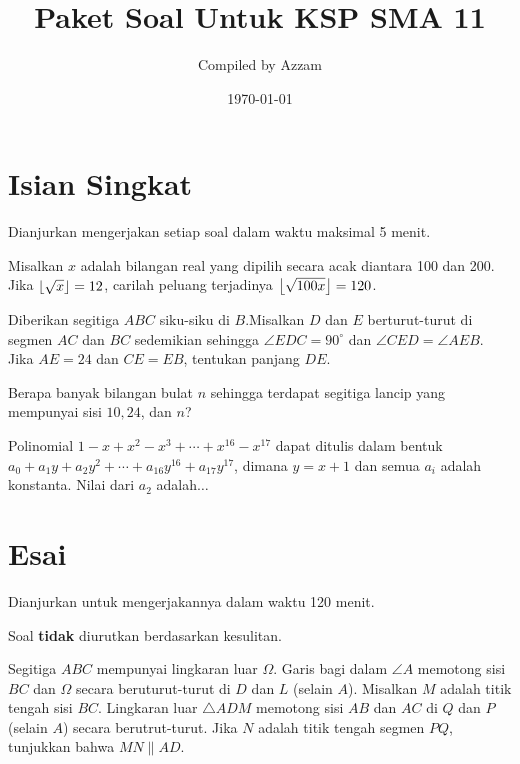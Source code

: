 \documentclass[12pt]{scrartcl}
\begin{document}
	\title{Paket Soal Untuk KSP SMA 11} %
	\date{\today}
	\author{Compiled by Azzam}
	\maketitle

\renewcommand*\contentsname{Daftar Isi}
\tableofcontents

\newpage
	
	\section{Isian Singkat}
	Dianjurkan mengerjakan setiap soal dalam waktu maksimal 5 menit.
	
	\begin{soalbaru}
	Misalkan $x$ adalah bilangan real yang dipilih secara acak diantara 100 dan 200. Jika $\left\lfloor \sqrt{x} \right\rfloor=12$, carilah peluang terjadinya $\left\lfloor \sqrt{100x} \right\rfloor=120$.
	\end{soalbaru}
	
	\begin{soalbaru}
	Diberikan segitiga $ABC$ siku-siku di $B$.Misalkan $D$ dan $E$ berturut-turut di segmen $AC$ dan $BC$ sedemikian sehingga $\angle EDC= 90^\circ$ dan $\angle CED = \angle AEB$. Jika $AE = 24$ dan $CE=EB$, tentukan panjang $DE$.
	\end{soalbaru}
	
	\begin{soalbaru}
	Berapa banyak bilangan bulat $n$ sehingga terdapat segitiga lancip yang mempunyai sisi $10,24$, dan $n$?
	\end{soalbaru}

	\begin{soalbaru}
	Polinomial $1-x+x^2-x^3+\cdots+x^{16}-x^{17}$ dapat ditulis dalam bentuk $a_0+a_1y+a_2y^2+\cdots +a_{16}y^{16}+a_{17}y^{17}$, dimana $y=x+1$ dan semua $a_i$ adalah konstanta. Nilai dari $a_2$ adalah$\dots$
	\end{soalbaru}

	\section{Esai}
	Dianjurkan untuk mengerjakannya dalam waktu 120 menit.
	
	Soal \textbf{tidak} diurutkan berdasarkan kesulitan. 
	
	\begin{soalbaru}
	Segitiga $ABC$ mempunyai lingkaran luar $\Omega$. Garis bagi dalam $\angle A$ memotong sisi $BC$ dan $\Omega$ secara beruturut-turut di $D$ dan $L$ (selain $A$). Misalkan $M$ adalah titik tengah sisi $BC$. Lingkaran luar $\triangle  ADM$ memotong sisi $AB$ dan $AC$ di $Q$ dan $P$ (selain $A$) secara berutrut-turut. Jika $N$ adalah titik tengah segmen $PQ$, tunjukkan bahwa $MN \parallel AD$. 
	\end{soalbaru}
	
\end{document}

